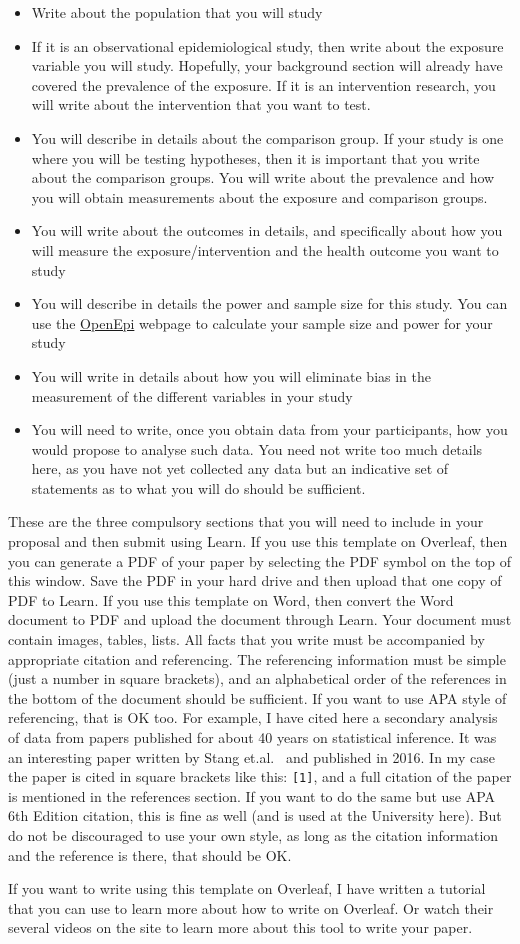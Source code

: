 \begin{itemize}
\item Write about the population that you will study
\item If it is an observational epidemiological study, then write about the exposure variable you will study. Hopefully, your background section will already have covered the prevalence of the exposure. If it is an intervention research, you will write about the intervention that you want to test.
\item You will describe in details about the comparison group. If your study is one where you will be testing hypotheses, then it is important that you write about the comparison groups. You will write about the prevalence and how you will obtain measurements about the exposure and comparison groups.
\item You will write about the outcomes in details, and specifically about how you will measure the exposure/intervention and the health outcome you want to study
\item You will describe in details the power and sample size for this study. You can use the \href{http://www.openepi.com/Menu/OE_Menu.htm}{OpenEpi} webpage to calculate your sample size and power for your study
\item You will write in details about how you will eliminate bias in the measurement of the different variables in your study
\item You will need to write, once you obtain data from your participants, how you would propose to analyse such data. You need not write too much details here, as you have not yet collected any data but an indicative set of statements as to what you will do should be sufficient. 
\end{itemize}

These are the three compulsory sections that you will need to include in your proposal and then submit using Learn. If you use this template on Overleaf, then you can generate a PDF of your paper by selecting the PDF symbol on the top of this window. Save the PDF in your hard drive and then upload that one copy of PDF to Learn. If you use this template on Word, then convert the Word document to PDF and upload the document through Learn. Your document must contain images, tables, lists. All facts that you write must be accompanied by appropriate citation and referencing. The referencing information must be simple (just a number in square brackets), and an alphabetical order of the references in the bottom of the document should be sufficient. If you want to use APA style of referencing, that is OK too. For example, I have cited here a secondary analysis of data from papers published for about 40 years on statistical inference. It was an interesting paper written by Stang et.al.~\cite{masarati2013formulation} and published in 2016. In my case the paper is cited in square brackets like this: \texttt{[1]}, and a full citation of the paper is mentioned in the references section. If you want to do the same but use APA 6th Edition citation, this is fine as well (and is used at the University here). But do not be discouraged to use your own style, as long as the citation information and the reference is there, that should be OK. 

If you want to write using this template on Overleaf, I have written a tutorial that you can use to learn more about how to write on Overleaf. Or watch their several videos on the site to learn more about this tool to write your paper. 